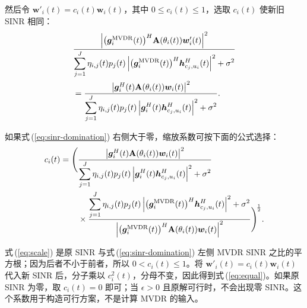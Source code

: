 \documentclass[11pt,a4paper]{ctexart}
\begin{document}
\begin{samepage}
然后令 $\bm w'_i(t)=c_i(t)\bm w_i(t)$，其中 $0\le c_i(t)\le1$，选取 $c_i(t)$ 使新旧 SINR 相同：
\begin{align}
&\frac{\left|\bigl(\bm g_i^{\rm MVDR}(t)\bigr)^H
\mathbf A(\theta_i(t))\bm w'_i(t)\right|^2}
{\displaystyle\sum_{j=1}^J\eta_{i,j}(t)p_j(t)
\left|\bigl(\bm g_i^{\rm MVDR}(t)\bigr)^H\bm h_{c_j,u_i}^{H}(t)\right|^2+\sigma^2}\notag\\
&=\frac{\left|\bm g_i^H(t)\mathbf A(\theta_i(t))\bm w_i(t)\right|^2}
{\displaystyle\sum_{j=1}^J\eta_{i,j}(t)p_j(t)
\left|\bm g_i^H(t)\bm h_{c_j,u_i}^{H}(t)\right|^2+\sigma^2}.\label{eq:equal}
\end{align}
\end{samepage}
\begin{samepage}
如果式\,(\ref{eq:sinr-domination}) 右侧大于零，缩放系数可按下面的公式选择：
\begin{align}\label{eq:scale}
c_i(t)=\Bigg(&
\frac{\left|\bm g_i^H(t)\mathbf A(\theta_i(t))\bm w_i(t)\right|^2}
{\displaystyle\sum_{j=1}^J\eta_{i,j}(t)p_j(t)
\left|\bm g_i^H(t)\bm h_{c_j,u_i}^{H}(t)\right|^2+\sigma^2}\notag\\
&\times\frac{\displaystyle\sum_{j=1}^J\eta_{i,j}(t)p_j(t)
\left|\bigl(\bm g_i^{\rm MVDR}(t)\bigr)^H\bm h_{c_j,u_i}^{H}(t)\right|^2+\sigma^2}
{\left|\bigl(\bm g_i^{\rm MVDR}(t)\bigr)^H\mathbf A(\theta_i(t))\bm w_i(t)\right|^2}\Bigg)^{\!\frac12}.
\end{align}
\end{samepage}
式\,(\ref{eq:scale}) 是原 SINR 与式\,(\ref{eq:sinr-domination}) 左侧 MVDR SINR 之比的平方根；因为后者不小于前者，所以 $0<c_i(t)\le1$。将 $\bm w'_i(t)=c_i(t)\bm w_i(t)$ 代入新 SINR 后，分子乘以 $c_i^2(t)$，分母不变，因此得到式\,(\ref{eq:equal})。如果原 SINR 为零，取 $c_i(t)=0$ 即可；当 $\epsilon>0$ 且原解可行时，不会出现零 SINR。这个系数用于构造可行方案，不是计算 MVDR 的输入。
\end{document}
